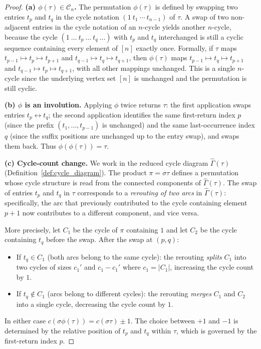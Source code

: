 \documentclass[12pt,a4paper]{article}
\theoremstyle{definition}
\newcommand{\Cn}{\mathcal{C}_n}
\begin{document}
\begin{proof}
\textbf{(a) $\phi(\tau)\in\Cn$.}
The permutation $\phi(\tau)$ is defined by swapping two entries
$t_p$ and $t_q$ in the cycle notation $(1\ t_1\ \cdots\ t_{n-1})$
of $\tau$.  A swap of two non-adjacent entries in the cycle
notation of an $n$-cycle yields another $n$-cycle, because
the cycle $(1\ \dots\ t_p\ \dots\ t_q\ \dots)$ with $t_p$ and $t_q$
interchanged is still a cyclic sequence containing every element
of $[n]$ exactly once.  Formally, if $\tau$ maps
$t_{p-1}\mapsto t_p\mapsto t_{p+1}$ and
$t_{q-1}\mapsto t_q\mapsto t_{q+1}$, then $\phi(\tau)$ maps
$t_{p-1}\mapsto t_q\mapsto t_{p+1}$ and
$t_{q-1}\mapsto t_p\mapsto t_{q+1}$,
with all other mappings unchanged.  This is a single $n$-cycle
since the underlying vertex set $[n]$ is unchanged and the
permutation is still cyclic.

\textbf{(b) $\phi$ is an involution.}
Applying $\phi$ twice returns $\tau$: the first application
swaps entries $t_p\leftrightarrow t_q$; the second application
identifies the same first-return index $p$ (since the prefix
$(t_1,\dots,t_{p-1})$ is unchanged) and the same last-occurrence
index $q$ (since the suffix positions are unchanged up to the
entry swap), and swaps them back.  Thus $\phi(\phi(\tau))=\tau$.

\textbf{(c) Cycle-count change.}
We work in the reduced cycle diagram $\widehat\Gamma(\tau)$
(Definition~\ref{def:cycle_diagram}).  The product $\pi=\sigma\tau$
defines a permutation whose cycle structure is read from the
connected components of $\widehat\Gamma(\tau)$.  The swap of entries
$t_p$ and $t_q$ in $\tau$ corresponds to a \emph{rerouting of two arcs}
in $\widehat\Gamma(\tau)$: specifically, the arc that previously
contributed to the cycle containing element $p+1$ now contributes to
a different component, and vice versa.

More precisely, let $C_1$ be the cycle of $\pi$ containing $1$
and let $C_2$ be the cycle containing $t_q$ before the swap.
After the swap at $(p,q)$:
\begin{itemize}
  \item If $t_q\in C_1$ (both arcs belong to the same cycle):
    the rerouting \emph{splits} $C_1$ into two cycles of sizes
    $c_1'$ and $c_1-c_1'$ where $c_1=|C_1|$, increasing the cycle
    count by $1$.
  \item If $t_q\notin C_1$ (arcs belong to different cycles):
    the rerouting \emph{merges} $C_1$ and $C_2$ into a single cycle,
    decreasing the cycle count by $1$.
\end{itemize}
In either case $c(\sigma\phi(\tau)) = c(\sigma\tau)\pm 1$.
The choice between $+1$ and $-1$ is determined by the relative
position of $t_p$ and $t_q$ within $\tau$, which is governed by
the first-return index $p$.


\end{proof}
\end{document}
